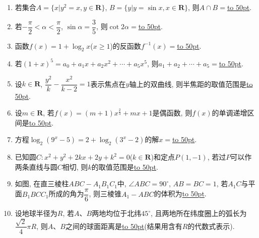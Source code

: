 \documentclass[10pt,a4paper]{article}
\newcommand{\blank}[1]{\underline{\hbox to #1pt{}}}
\begin{document}
\begin{enumerate}[1.]

\item 若集合$A=\{x|y^2=x,y\in \mathbf{R}\}$, $B=\{y|y=\sin x,x\in \mathbf{R}\}$, 则$A\cap B=$\blank{50}.
\item 若$-\dfrac{\pi}{2}<\alpha <\dfrac{\pi}{2}$, $\sin \alpha =\dfrac{3}{5}$, 则$\cot 2\alpha =$\blank{50}.
\item 函数$f(x)=1+\log_2 x$($x\ge 1$)的反函数$f^{-1}(x)=$\blank{50}.
\item 若$(1+x)^5=a_0+a_1x+a_2x^2+\cdots+a_5x^5$, 则$a_1+a_2+\cdots+a_5=$\blank{50}.
\item 设$k\in \mathbf{R}$, $\dfrac{y^2}{k}-\dfrac{x^2}{k-2}=1$表示焦点在$y$轴上的双曲线, 则半焦距的取值范围是\blank{50}.
\item 设$m\in \mathbf{R}$, 若$f(x)=(m+1)x^{\tfrac{2}{3}}+mx+1$是偶函数, 则$f(x)$的单调递增区间是\blank{50}.
\item 方程$\log_2(9^x-5)=2+\log_2(3^x-2)$的解$x=$\blank{50}.
\item 已知圆$C:x^2+y^2+2kx+2y+k^2=0$($k\in \mathbf{R}$)和定点$P(1,-1)$, 若过$P$可以作两条直线与圆$C$相切, 则$k$的取值范围是\blank{50}.
\item 如图, 在直三棱柱$ABC-A_1B_1C_1$中, $\angle ABC=90^\circ$, $AB=BC=1$, 若$A_1C$与平面$B_1BCC_1$所成的角为$\dfrac{\pi}{6}$, 则三棱锥$A_1-ABC$的体积为\blank{50}.
\begin{center}
\end{center}
\item 设地球半径为$R$, 若$A$、$B$两地均位于北纬$45^\circ$, 且两地所在纬度圈上的弧长为$\dfrac{\sqrt{2}}{4}\pi R$, 则$A$、$B$之间的球面距离是\blank{50}(结果用含有$R$的代数式表示).



\end{enumerate}
\end{document}
